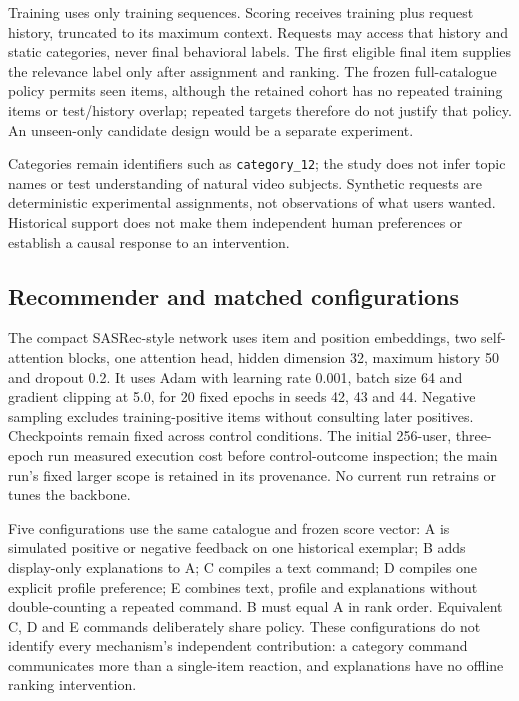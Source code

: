\documentclass[conference]{IEEEtran}
\begin{document}
Training uses only training sequences. Scoring receives training plus request history, truncated to its maximum context. Requests may access that history and static categories, never final behavioral labels. The first eligible final item supplies the relevance label only after assignment and ranking. The frozen full-catalogue policy permits seen items, although the retained cohort has no repeated training items or test/history overlap; repeated targets therefore do not justify that policy. An unseen-only candidate design would be a separate experiment.

Categories remain identifiers such as \texttt{category\_12}; the study does not infer topic names or test understanding of natural video subjects. Synthetic requests are deterministic experimental assignments, not observations of what users wanted. Historical support does not make them independent human preferences or establish a causal response to an intervention.

\subsection{Recommender and matched configurations}
The compact SASRec-style network uses item and position embeddings, two self-attention blocks, one attention head, hidden dimension 32, maximum history 50 and dropout 0.2. It uses Adam with learning rate 0.001, batch size 64 and gradient clipping at 5.0, for 20 fixed epochs in seeds 42, 43 and 44. Negative sampling excludes training-positive items without consulting later positives. Checkpoints remain fixed across control conditions. The initial 256-user, three-epoch run measured execution cost before control-outcome inspection; the main run's fixed larger scope is retained in its provenance. No current run retrains or tunes the backbone.

Five configurations use the same catalogue and frozen score vector: A is simulated positive or negative feedback on one historical exemplar; B adds display-only explanations to A; C compiles a text command; D compiles one explicit profile preference; E combines text, profile and explanations without double-counting a repeated command. B must equal A in rank order. Equivalent C, D and E commands deliberately share policy. These configurations do not identify every mechanism's independent contribution: a category command communicates more than a single-item reaction, and explanations have no offline ranking intervention.
\end{document}
